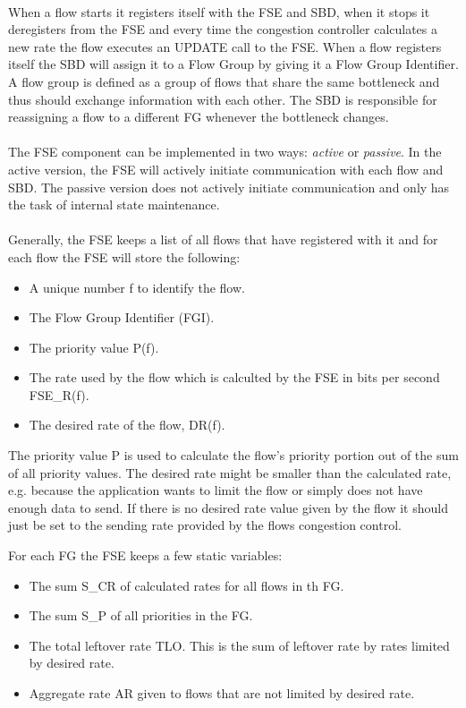 \paragraph{}
When a flow starts it registers itself with the FSE and SBD, when it stops it deregisters from the FSE and every time the congestion controller calculates a new rate the flow executes an UPDATE call to the FSE.
When a flow registers itself the SBD will assign it to a Flow Group by giving it a Flow Group Identifier.
A flow group is defined as a group of flows that share the same bottleneck and thus should exchange information with each other. 
The SBD is responsible for reassigning a flow to a different FG whenever the bottleneck changes.
\paragraph{}
The FSE component can be implemented in two ways: \textit{active} or \textit{passive}.
In the active version, the FSE will actively initiate communication with each flow and SBD. 
The passive version does not actively initiate communication and only has the task of internal state maintenance.

\paragraph{}
Generally, the FSE keeps a list of all flows that have registered with it and for each flow the FSE will store the following:
\begin{itemize}
    \item A unique number f to identify the flow.
    \item The Flow Group Identifier (FGI).
    \item The priority value P(f).
    \item The rate used by the flow which is calculted by the FSE in bits per second FSE\_R(f).
    \item The desired rate of the flow, DR(f).
\end{itemize}

The priority value P is used to calculate the flow's priority portion out of the sum of all priority values.
The desired rate might be smaller than the calculated rate, e.g. because the application wants to limit the flow or simply does not have enough data to send. 
If there is no desired rate value given by the flow it should just be set to the sending rate provided by the flows congestion control.

For each FG the FSE keeps a few static variables:
\begin{itemize}
    \item The sum S\_CR of calculated rates for all flows in th FG.
    \item The sum S\_P of all priorities in the FG.
    \item The total leftover rate TLO. This is the sum of leftover rate by rates limited by desired rate.
    \item Aggregate rate AR given to flows that are not limited by desired rate. 
\end{itemize}

